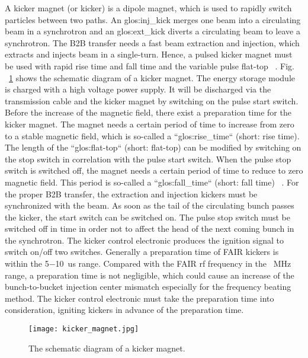 A kicker magnet (or kicker) is a dipole magnet, which is used to rapidly switch particles between two paths. An \gls{glos:inj_kick} merges one beam into a circulating beam in a synchrotron and an \gls{glos:ext_kick} diverts a circulating beam to leave a synchrotron. The B2B transfer needs a fast beam extraction and injection, which extracts and injects beam in a single-turn. Hence, a pulsed kicker magnet must be used with rapid rise time and fall time and the variable pulse flat-top ~\cite{petzenhauser_concept_2016}. Fig. ~\ref{kicker_magnet} shows the schematic diagram of a kicker magnet. The energy storage module%
 is charged with a high voltage power supply. It will be discharged via the transmission cable and the kicker magnet by switching on the pulse start switch. Before the increase of the magnetic field, there exist a preparation time for the kicker magnet. The magnet needs a certain period of time to increase from zero to a stable magnetic field, which is so-called a ``\gls{glos:rise_time}`` (short: rise time). The length of the ``\gls{glos:flat-top}`` (short: flat-top) can be modified by switching on the stop switch in correlation with the pulse start switch. When the pulse stop switch is switched off, the magnet needs a certain period of time to reduce to zero magnetic field. This period is so-called a ``\gls{glos:fall_time}`` (short: fall time) ~\cite{udo_injection_2014}. For the proper B2B transfer, the extraction and injection kickers must be synchronized with the beam. As soon as the tail of the circulating bunch passes the kicker, the start switch can be switched on. The pulse stop switch must be switched off in time in order not to affect the head of the next coming bunch in the synchrotron. The kicker control electronic produces the ignition signal to switch on/off two switches. Generally a preparation time of FAIR kickers is within the \SI{5}{}$-$\SI{10}{us} range. Compared with the FAIR rf frequency in the \SI{}{MHz} range, a preparation time is not negligible, which could cause an increase of the bunch-to-bucket injection center mismatch especially for the frequency beating method. The kicker control electronic must take the preparation time into consideration, igniting kickers in advance of the preparation time.
\begin{figure}[!htb]
   \centering   
   \texttt{[image: kicker\_magnet.jpg]}
   \caption{The schematic diagram of a kicker magnet.}
   \label{kicker_magnet}
\end{figure}
 
